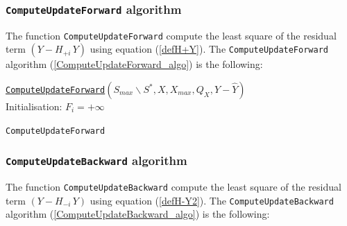 \newpage
\subsubsection{\texttt{ComputeUpdateForward} algorithm}

 The function \texttt{ComputeUpdateForward} compute the least square of the residual term $(Y-H_{+i}\,Y)$ using equation (\ref{defH+Y}).
 The \texttt{ComputeUpdateForward} algorithm (\ref{ComputeUpdateForward_algo}) is the following:

\begin{algorithm}
\label{ComputeUpdateForward_algo}
\underline{\texttt{ComputeUpdateForward}}$(S_{max} \backslash S^*,X,X_{max},Q_X,Y-\hat{Y})$\\
\BlankLine
Initialisation: $F_i = +\infty$
\BlankLine
{}
\caption{\texttt{ComputeUpdateForward} }
\end{algorithm}

\subsubsection{\texttt{ComputeUpdateBackward} algorithm}

The function \texttt{ComputeUpdateBackward} compute the least square of the residual term  $(Y-H_{-i}\,Y)$ using equation (\ref{defH-Y2}).
 The \texttt{ComputeUpdateBackward} algorithm (\ref{ComputeUpdateBackward_algo}) is the following:


